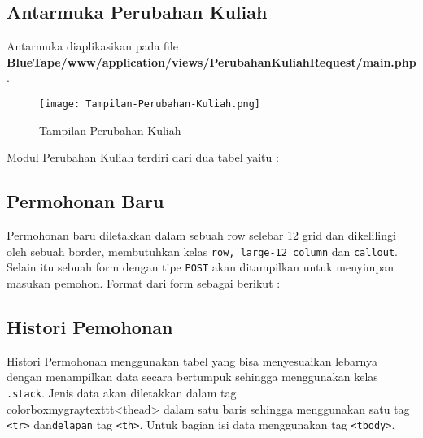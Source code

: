 \subsection{Antarmuka Perubahan Kuliah}
Antarmuka diaplikasikan pada file \textbf{BlueTape/www/application/views/PerubahanKuliahRequest/main.php}.
\begin{figure} [H]
	\centering  
	\texttt{[image: Tampilan-Perubahan-Kuliah.png]}  
	\caption{Tampilan Perubahan Kuliah} 
\end{figure}
Modul Perubahan Kuliah terdiri dari dua tabel yaitu :


\subsection{Permohonan Baru}
Permohonan baru diletakkan dalam sebuah row selebar 12 grid dan dikelilingi oleh sebuah border, membutuhkan kelas \colorbox{mygray}{\texttt{row, large-12 column}} dan \texttt{callout}. Selain itu sebuah form dengan tipe \texttt{POST} akan ditampilkan untuk menyimpan masukan pemohon. Format dari form sebagai berikut :



\subsection{Histori Pemohonan}
Histori Permohonan menggunakan tabel yang bisa menyesuaikan lebarnya dengan menampilkan data secara bertumpuk sehingga menggunakan kelas \colorbox{mygray}{\texttt{.stack}}. Jenis data akan diletakkan dalam tag \\colorbox{mygray}{texttt{<thead>}} dalam satu baris sehingga menggunakan satu tag \colorbox{mygray}{\texttt{<tr>}} dan\texttt{delapan} tag \colorbox{mygray}{\texttt{<th>}}. Untuk bagian isi data menggunakan tag \colorbox{mygray}{\texttt{<tbody>}}.

